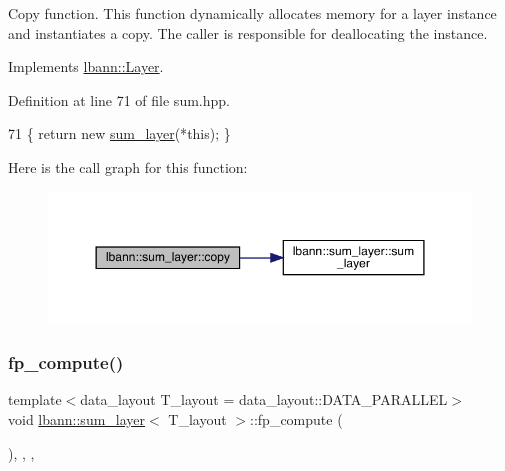 Copy function. This function dynamically allocates memory for a layer instance and instantiates a copy. The caller is responsible for deallocating the instance. 

Implements \hyperlink{classlbann_1_1Layer_af420f22bbac801c85483ade84588a23f}{lbann\+::\+Layer}.



Definition at line 71 of file sum.\+hpp.


\begin{DoxyCode}
71 \{ \textcolor{keywordflow}{return} \textcolor{keyword}{new} \hyperlink{classlbann_1_1sum__layer_a00dfb715bda89ac6aaa10f045c9a49a5}{sum\_layer}(*\textcolor{keyword}{this}); \}
\end{DoxyCode}
Here is the call graph for this function\+:\nopagebreak
\begin{figure}[H]
\begin{center}
\leavevmode
\includegraphics[width=350pt]{classlbann_1_1sum__layer_a8b6581df51a10b1511c1df6322f445a4_cgraph}
\end{center}
\end{figure}
\mbox{\label{classlbann_1_1sum__layer_a8d235d61507e76f42ee83a74d1098977}} 
\subsubsection{\texorpdfstring{fp\+\_\+compute()}{fp\_compute()}}
{\footnotesize\ttfamily template$<$data\+\_\+layout T\+\_\+layout = data\+\_\+layout\+::\+D\+A\+T\+A\+\_\+\+P\+A\+R\+A\+L\+L\+EL$>$ \\
void \hyperlink{classlbann_1_1sum__layer}{lbann\+::sum\+\_\+layer}$<$ T\+\_\+layout $>$\+::fp\+\_\+compute (\begin{DoxyParamCaption}{ }\end{DoxyParamCaption})\hspace{0.3cm}{\ttfamily [inline]}, {\ttfamily [override]}, {\ttfamily [protected]}, {\ttfamily [virtual]}}

